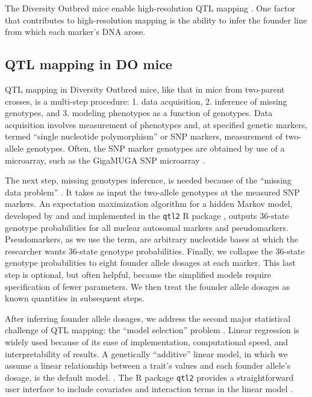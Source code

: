 \documentclass[]{article}\usepackage[]{graphicx}\usepackage[]{color}
\begin{document}
The Diversity Outbred mice enable high-resolution QTL mapping \citep{gatti2014quantitative}. One factor that contributes to high-resolution mapping is the ability to infer the founder line from which each marker's DNA arose. 




\subsection{QTL mapping in DO mice}

QTL mapping in Diversity Outbred mice, like that in mice from two-parent crosses, is a multi-step procedure: 1. data acquisition, 2. inference of missing genotypes, and 3. modeling phenotypes as a function of genotypes. Data acquisition involves measurement of phenotypes and, at specified genetic markers, termed ``single nucleotide polymorphism'' or SNP markers, measurement of two-allele genotypes. Often, the SNP marker genotypes are obtained by use of a microarray, such as the GigaMUGA SNP microarray \citep{morgan2015mouse}. 

The next step, missing genotypes inference, is needed because of the ``missing data problem'' \citep{broman2009guide}. It takes as input the two-allele genotypes at the measured SNP markers. An expectation maximization algorithm \citep{dempster1977maximum} for a hidden Markov model, developed by \citet{broman2012haplotype} and \citet{broman2012genotype} and implemented in the \texttt{qtl2} R package \citep{broman2019rqtl2}, outputs 36-state genotype probabilities for all nuclear autosomal markers and pseudomarkers. Pseudomarkers, as we use the term, are arbitrary nucleotide bases at which the researcher wants 36-state genotype probabilities. Finally, we collapse the 36-state genotype probabilities to eight founder allele dosages at each marker. This last step is optional, but often helpful, because the simplified models require specification of fewer parameters. We then treat the founder allele dosages as known quantities in subsequent steps. 


After inferring founder allele dosages, we address the second major statistical challenge of 
QTL mapping: the ``model selection'' problem \citep{broman2009guide}.
Linear regression is widely used because of its ease of implementation,
computational speed, and interpretability of results.
A genetically ``additive'' linear model, in which we assume a linear relationship between
a trait's values and each founder allele's dosage, is the default model.
\citep{gatti2014quantitative,broman2019rqtl2}.
The R package \texttt{qtl2} provides a straightforward user
interface to include covariates and interaction terms in the linear model \citep{broman2019rqtl2}.
\end{document}
